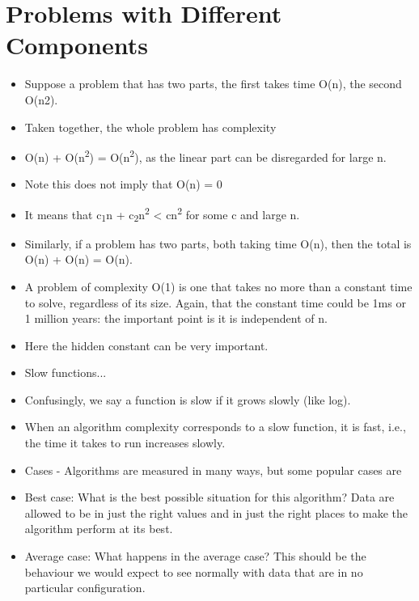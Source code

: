 \documentclass{beamer}
\begin{document}
\section{Problems with Different Components}
\begin{frame}
\begin{itemize}
\item Suppose a problem that has two parts, the first takes time O(n), the second O(n2).
\item Taken together, the whole problem has complexity
\item O(n) + O(n\textsuperscript{2}) = O(n\textsuperscript{2}), as the linear part can be disregarded for large n.
\item Note this does not imply that O(n) = 0 
\item It means that c\textsubscript{1}n + c\textsubscript{2}n\textsuperscript{2} {\textless} cn\textsuperscript{2} for some c and large n.
\item Similarly, if a problem has two parts, both taking time O(n), then the total is O(n) + O(n) = O(n).
\item A problem of complexity O(1) is one that takes no more than a constant time to solve, regardless of its size.
Again, that the constant time could be 1ms or 1 million years: the important point is it is independent of n. 
\item Here the hidden constant can be very important.
\end{itemize}
\end{frame} 

\begin{frame}
\begin{itemize}
\item Slow functions...
\bigskip
\item Confusingly, we say a function is slow if it grows slowly (like log).
\item When an algorithm complexity corresponds to a slow function, it is fast, i.e., the time it takes to run increases
slowly.
\end{itemize} 
\end{frame} 

\begin{frame}
\begin{itemize}
\item Cases - Algorithms are measured in many ways, but some popular cases are
\bigskip
\item Best case: What is the best possible situation for this algorithm? Data are allowed to be in just the right values
and in just the right places to make the algorithm perform at its best.
\item Average case: What happens in the average case? This should be the behaviour we would expect to see normally with
data that are in no particular configuration.
\end{itemize}
\end{frame} 
\end{document}
